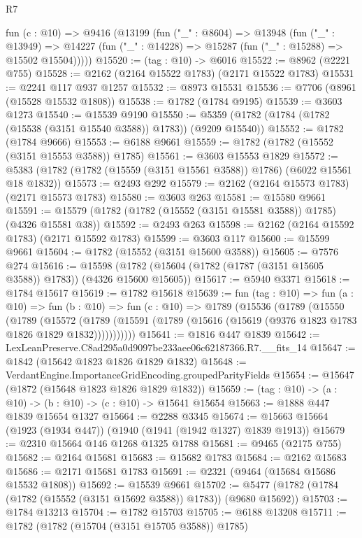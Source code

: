 \begin{lexlean}{R7}
\begin{coremodule}
  fun (c : @10) =>
  @9416
    (@13199
      (fun ("_" : @8604) =>
      @13948
        (fun ("_" : @13949) =>
        @14227 (fun ("_" : @14228) => @15287 (fun ("_" : @15288) => @15502 @15504)))))
@15520 := (tag : @10) -> @6016
@15522 := @8962 (@2221 @755)
@15528 := @2162 (@2164 @15522 @1783) (@2171 @15522 @1783)
@15531 := @2241 @117 @937 @1257
@15532 := @8973 @15531
@15536 := @7706 (@8961 (@15528 @15532 @1808))
@15538 := @1782 (@1784 @9195)
@15539 := @3603 @1273
@15540 := @15539 @9190
@15550 := @5359 (@1782 (@1784 (@1782 (@15538 (@3151 @15540 @3588)) @1783)) (@9209 @15540))
@15552 := @1782 (@1784 @9666)
@15553 := @6188 @9661
@15559 := @1782 (@1782 (@15552 (@3151 @15553 @3588)) @1785)
@15561 := @3603 @15553 @1829
@15572 := @5383 (@1782 (@1782 (@15559 (@3151 @15561 @3588)) @1786) (@6022 @15561 @18 @1832))
@15573 := @2493 @292
@15579 := @2162 (@2164 @15573 @1783) (@2171 @15573 @1783)
@15580 := @3603 @263
@15581 := @15580 @9661
@15591 := @15579 (@1782 (@1782 (@15552 (@3151 @15581 @3588)) @1785) (@4326 @15581 @38))
@15592 := @2493 @263
@15598 := @2162 (@2164 @15592 @1783) (@2171 @15592 @1783)
@15599 := @3603 @117
@15600 := @15599 @9661
@15604 := @1782 (@15552 (@3151 @15600 @3588))
@15605 := @7576 @274
@15616 := @15598 (@1782 (@15604 (@1782 (@1787 (@3151 @15605 @3588)) @1783)) (@4326 @15600 @15605))
@15617 := @5940 @3371
@15618 := @1784 @15617
@15619 := @1782 @15618
@15639 := fun (tag : @10) =>
  fun (a : @10) =>
  fun (b : @10) =>
  fun (c : @10) =>
  @1789
    (@15536
      (@1789
        (@15550
          (@1789
            (@15572
              (@1789 (@15591 (@1789 (@15616 (@15619 (@9376 @1823 @1783 @1826 @1829 @1832)))))))))))
@15641 := @1816 @447 @1839
@15642 := LexLeanPreserve.C8ad295a0d9097be233aee06c62187366.R7.__fits_14
@15647 := @1842 (@15642 @1823 @1826 @1829 @1832)
@15648 := VerdantEngine.ImportanceGridEncoding.groupedParityFields
@15654 := @15647 (@1872 (@15648 @1823 @1826 @1829 @1832))
@15659 := (tag : @10) -> (a : @10) -> (b : @10) -> (c : @10) -> @15641 @15654
@15663 := @1888 @447 @1839 @15654 @1327
@15664 := @2288 @3345
@15674 := @15663 @15664 (@1923 (@1934 @447)) (@1940 (@1941 (@1942 @1327) @1839 @1913))
@15679 := @2310 @15664 @146 @1268 @1325 @1788
@15681 := @9465 (@2175 @755)
@15682 := @2164 @15681
@15683 := @15682 @1783
@15684 := @2162 @15683
@15686 := @2171 @15681 @1783
@15691 := @2321 (@9464 (@15684 @15686 @15532 @1808))
@15692 := @15539 @9661
@15702 := @5477 (@1782 (@1784 (@1782 (@15552 (@3151 @15692 @3588)) @1783)) (@9680 @15692))
@15703 := @1784 @13213
@15704 := @1782 @15703
@15705 := @6188 @13208
@15711 := @1782 (@1782 (@15704 (@3151 @15705 @3588)) @1785)

\end{coremodule}
\end{lexlean}
